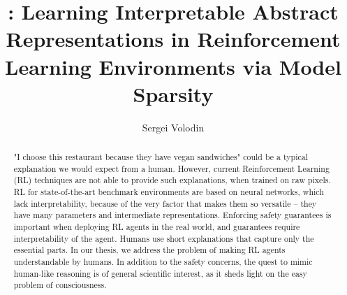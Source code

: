 \documentclass[a4paper,11pt,oneside]{report}
\title{\sysname: Learning Interpretable Abstract Representations in Reinforcement Learning Environments via Model Sparsity}
\author{Sergei Volodin}
\begin{document}
    \maketitle
    \makededication
    \makeacks

\listoftodos

\begin{abstract}

"I choose this restaurant because they have vegan sandwiches" could be a typical explanation we would expect from a human. However, current Reinforcement Learning (RL) techniques are not able to provide such explanations, when trained on raw pixels.
RL for state-of-the-art benchmark environments are based on neural networks, which lack interpretability, because of the very factor that makes them so versatile -- they have many parameters and intermediate representations.
Enforcing safety guarantees is important when deploying RL agents in the real world, and guarantees require interpretability of the agent.
Humans use short explanations that capture only the essential parts.
In our thesis, we address the problem of making RL agents understandable by humans.
In addition to the safety concerns, the quest to mimic human-like reasoning is of general scientific interest, as it sheds light on the easy problem of consciousness.


\end{abstract}
\end{document}

